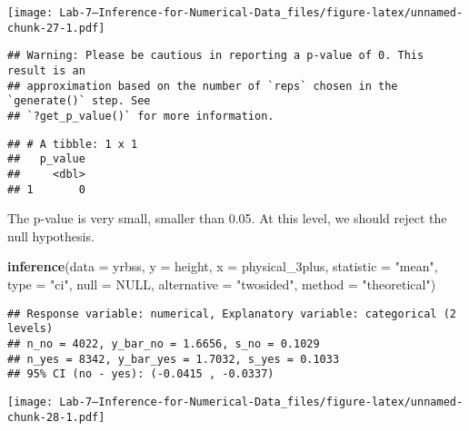 \documentclass[
]{article}
\newenvironment{Shaded}{\begin{snugshade}}{\end{snugshade}}
\newcommand{\DataTypeTok}[1]{\textcolor[rgb]{0.13,0.29,0.53}{#1}}
\newcommand{\KeywordTok}[1]{\textcolor[rgb]{0.13,0.29,0.53}{\textbf{#1}}}
\newcommand{\NormalTok}[1]{#1}
\newcommand{\OperatorTok}[1]{\textcolor[rgb]{0.81,0.36,0.00}{\textbf{#1}}}
\newcommand{\OtherTok}[1]{\textcolor[rgb]{0.56,0.35,0.01}{#1}}
\newcommand{\StringTok}[1]{\textcolor[rgb]{0.31,0.60,0.02}{#1}}
\begin{document}
\texttt{[image: Lab-7---Inference-for-Numerical-Data\_files/figure-latex/unnamed-chunk-27-1.pdf]}

\begin{Shaded}
\end{Shaded}

\begin{verbatim}
## Warning: Please be cautious in reporting a p-value of 0. This result is an
## approximation based on the number of `reps` chosen in the `generate()` step. See
## `?get_p_value()` for more information.
\end{verbatim}

\begin{verbatim}
## # A tibble: 1 x 1
##   p_value
##     <dbl>
## 1       0
\end{verbatim}

The p-value is very small, smaller than 0.05. At this level, we should
reject the null hypothesis.

\begin{Shaded}
\begin{Highlighting}[]
\KeywordTok{inference}\NormalTok{(}\DataTypeTok{data =}\NormalTok{ yrbss, }\DataTypeTok{y =}\NormalTok{ height, }\DataTypeTok{x =}\NormalTok{ physical_3plus,}
          \DataTypeTok{statistic =} \StringTok{"mean"}\NormalTok{,}
          \DataTypeTok{type =} \StringTok{"ci"}\NormalTok{, }
          \DataTypeTok{null =} \OtherTok{NULL}\NormalTok{, }
          \DataTypeTok{alternative =} \StringTok{"twosided"}\NormalTok{, }
          \DataTypeTok{method =} \StringTok{"theoretical"}\NormalTok{)}
\end{Highlighting}
\end{Shaded}

\begin{verbatim}
## Response variable: numerical, Explanatory variable: categorical (2 levels)
## n_no = 4022, y_bar_no = 1.6656, s_no = 0.1029
## n_yes = 8342, y_bar_yes = 1.7032, s_yes = 0.1033
## 95% CI (no - yes): (-0.0415 , -0.0337)
\end{verbatim}

\texttt{[image: Lab-7---Inference-for-Numerical-Data\_files/figure-latex/unnamed-chunk-28-1.pdf]}
\end{document}
